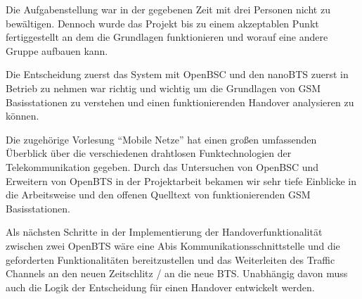 
Die Aufgabenstellung war in der gegebenen Zeit mit drei Personen nicht zu bewältigen. Dennoch wurde das Projekt bis zu einem akzeptablen Punkt fertiggestellt an dem die Grundlagen funktionieren und worauf eine andere Gruppe aufbauen kann.

Die Entscheidung zuerst das System mit OpenBSC und den nanoBTS zuerst in Betrieb zu nehmen war richtig und wichtig um die Grundlagen von GSM Basisstationen zu verstehen und einen funktionierenden Handover analysieren zu können.

Die zugehörige Vorlesung "`Mobile Netze"' hat einen großen umfassenden Überblick über die verschiedenen drahtlosen Funktechnologien der Telekommunikation gegeben. Durch das Untersuchen von OpenBSC und Erweitern von OpenBTS in der Projektarbeit bekamen wir sehr tiefe Einblicke in die Arbeitsweise und den offenen Quelltext von funktionierenden GSM Basisstationen.

Als nächsten Schritte in der Implementierung der Handoverfunktionalität zwischen zwei OpenBTS wäre eine Abis Kommunikationsschnittstelle und die geforderten Funktionalitäten bereitzustellen und das Weiterleiten des Traffic Channels an den neuen Zeitschlitz / an die neue BTS. Unabhängig davon muss auch die Logik der Entscheidung für einen Handover entwickelt werden.

